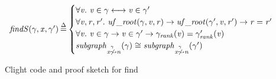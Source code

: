 \begin{figure}[t]
\begin{equation*}
\begin{array}{l@{\hspace{2pt}}c@{\hspace{2pt}}l}
\m{findS}(\gamma,\m{x},\gamma') & \defeq & \begin{cases}
\forall \m{v}.~ \m{v}\in\gamma <-> \m{v}\in\gamma' \\
\forall \m{v}, \m{r}, \m{r'}.~ \m{uf\_root}(\gamma, \m{v}, \m{r}) -> \m{uf\_root}(\gamma', \m{v}, \m{r'}) -> \m{r} = \m{r'} \\ 
\forall \m{v}.~ \m{v}\in\gamma -> \m{v}\in\gamma' -> \gamma_\m{rank}(\m{v}) = \gamma'_\m{rank}(\m{v}) \\
\m{subgraph}_{\m{x} \mathrel{{\stackrel{\gamma~}{\not\leadsto}}} \m{n}}(\gamma) \cong \m{subgraph}_{\m{x} \mathrel{{\stackrel{\gamma~}{\not\leadsto}}} \m{n}}(\gamma') 
\end{cases} \\
\end{array}
\end{equation*}




\vspace{-0.4em}
\caption{Clight code and proof sketch for find}
\label{fig:find}
\vspace{-1em}
\end{figure} 
